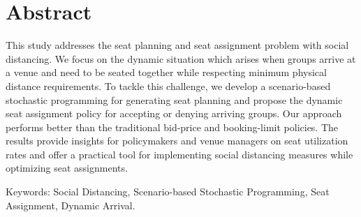 
\section*{Abstract}

This study addresses the seat planning and seat assignment problem with social distancing. We focus on the dynamic situation which arises when groups arrive at a venue and need to be seated together while respecting minimum physical distance requirements. To tackle this challenge, we develop a scenario-based stochastic programming for generating seat planning and propose the dynamic seat assignment policy for accepting or denying arriving groups. Our approach performs better than the traditional bid-price and booking-limit policies. The results provide insights for policymakers and venue managers on seat utilization rates and offer a practical tool for implementing social distancing measures while optimizing seat assignments.


Keywords: Social Distancing, Scenario-based Stochastic Programming, Seat Assignment, Dynamic Arrival.



